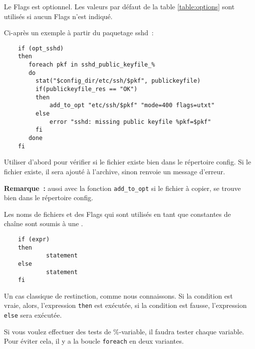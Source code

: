    Le Flags est optionnel. Les valeurs par défaut de la table \ref{table:options}
   sont utilisés si aucun Flags n'est indiqué.

   Ci-après un exemple à partir du paquetage \og{}sshd\fg{}~:

\begin{example}
\begin{verbatim}
    if (opt_sshd)
    then
       foreach pkf in sshd_public_keyfile_%
       do
         stat("$config_dir/etc/ssh/$pkf", publickeyfile)
         if(publickeyfile_res == "OK")
         then
             add_to_opt "etc/ssh/$pkf" "mode=400 flags=utxt"
         else
             error "sshd: missing public keyfile %pkf=$pkf"
         fi
       done
    fi
\end{verbatim}
\end{example}

   Utiliser d'abord  pour vérifier si le
   fichier existe bien dans le répertoire config. Si le fichier existe, il sera
   ajouté à l'archive, sinon  renvoie un message d'erreur.

   \textbf{Remarque~:}   aussi
   avec la fonction \texttt{add\_to\_opt} si le fichier à copier, se trouve bien
   dans le répertoire config.

   Les noms de fichiers et des Flags qui sont utilisés en tant que constantes de chaîne
   sont soumis à une .



\begin{example}
\begin{verbatim}
    if (expr)
    then
            statement
    else
            statement
    fi
\end{verbatim}
\end{example}

    Un cas classique de restinction, comme nous connaissons. Si la condition est vraie,
	alors, l’expression \texttt{then} est exécutée, si la condition est fausse, l’expression
	\texttt{else} sera exécutée.

    Si vous voulez effectuer des tests de \%-variable, il faudra tester chaque
    variable. Pour éviter cela, il y a la boucle \texttt{foreach} en deux variantes.


